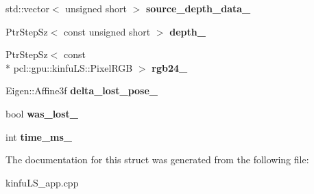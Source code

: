 \begin{DoxyCompactItemize}
\item 
\hypertarget{struct_kin_fu_l_s_app_a3cf45ae0744e4fe782d17b5445226652}{std\+::vector$<$ unsigned short $>$ {\bfseries source\+\_\+depth\+\_\+data\+\_\+}}\label{struct_kin_fu_l_s_app_a3cf45ae0744e4fe782d17b5445226652}

\item 
\hypertarget{struct_kin_fu_l_s_app_af93fe53119a99a3d17b419c4bfb811f3}{Ptr\+Step\+Sz$<$ const unsigned short $>$ {\bfseries depth\+\_\+}}\label{struct_kin_fu_l_s_app_af93fe53119a99a3d17b419c4bfb811f3}

\item 
\hypertarget{struct_kin_fu_l_s_app_a0a783d5d6f1b99c22a226e68679c5dfa}{Ptr\+Step\+Sz$<$ const \\*
pcl\+::gpu\+::kinfu\+L\+S\+::\+Pixel\+R\+G\+B $>$ {\bfseries rgb24\+\_\+}}\label{struct_kin_fu_l_s_app_a0a783d5d6f1b99c22a226e68679c5dfa}

\item 
\hypertarget{struct_kin_fu_l_s_app_a1f73527db56daf7519e0028708b02656}{Eigen\+::\+Affine3f {\bfseries delta\+\_\+lost\+\_\+pose\+\_\+}}\label{struct_kin_fu_l_s_app_a1f73527db56daf7519e0028708b02656}

\item 
\hypertarget{struct_kin_fu_l_s_app_a1b0459479f1f21f94e344b7cffbb2796}{bool {\bfseries was\+\_\+lost\+\_\+}}\label{struct_kin_fu_l_s_app_a1b0459479f1f21f94e344b7cffbb2796}

\item 
\hypertarget{struct_kin_fu_l_s_app_ab1242b012cf2272bcb7921716d2d2f59}{int {\bfseries time\+\_\+ms\+\_\+}}\label{struct_kin_fu_l_s_app_ab1242b012cf2272bcb7921716d2d2f59}

\end{DoxyCompactItemize}


The documentation for this struct was generated from the following file\+:\begin{DoxyCompactItemize}
\item 
kinfu\+L\+S\+\_\+app.\+cpp\end{DoxyCompactItemize}
